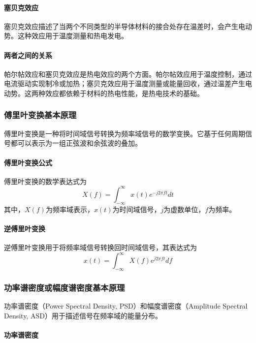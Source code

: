 \documentclass[dvipsnames, svgnames,a4paper,11pt]{article}
\begin{document}
\paragraph*{塞贝克效应}

塞贝克效应描述了当两个不同类型的半导体材料的接合处存在温差时，会产生电动势。这种效应用于温度测量和热电发电。

\paragraph*{两者之间的关系}

帕尔帖效应和塞贝克效应是热电效应的两个方面。帕尔帖效应用于温度控制，通过电流驱动实现制冷或加热；塞贝克效应用于温度测量或能量回收，通过温差产生电动势。这两种效应都依赖于材料的热电性能，是热电技术的基础。

\subsubsection{傅里叶变换基本原理}

傅里叶变换是一种将时间域信号转换为频率域信号的数学变换。它基于任何周期信号都可以表示为一组正弦波和余弦波的叠加。

\paragraph*{傅里叶变换公式}

傅里叶变换的数学表达式为
\[ X(f) = \int_{-\infty}^{\infty} x(t) e^{-j 2 \pi f t} dt \]
其中，$X(f)$为频率域表示，$x(t)$为时间域信号，$j$为虚数单位，$f$为频率。

\paragraph*{逆傅里叶变换}

逆傅里叶变换用于将频率域信号转换回时间域信号，其表达式为
\[ x(t) = \int_{-\infty}^{\infty} X(f) e^{j 2 \pi f t} df \]

\subsubsection*{功率谱密度或幅度谱密度基本原理}

功率谱密度（Power Spectral Density, PSD）和幅度谱密度（Amplitude Spectral Density, ASD）用于描述信号在频率域的能量分布。

\paragraph*{功率谱密度}
\end{document}

